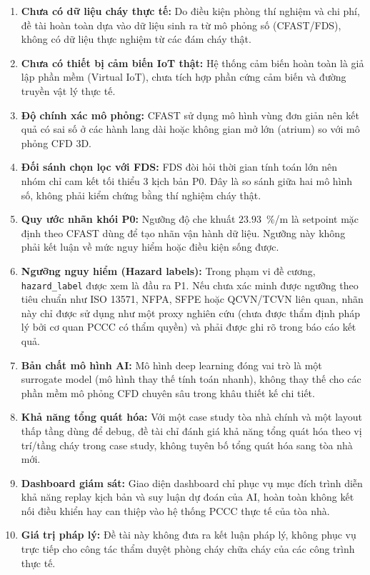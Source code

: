 \begin{enumerate}
  \item \textbf{Chưa có dữ liệu cháy thực tế:} Do điều kiện phòng thí nghiệm và chi phí, đề tài hoàn toàn dựa vào dữ liệu sinh ra từ mô phỏng số (CFAST/FDS), không có dữ liệu thực nghiệm từ các đám cháy thật.
  \item \textbf{Chưa có thiết bị cảm biến IoT thật:} Hệ thống cảm biến hoàn toàn là giả lập phần mềm (Virtual IoT), chưa tích hợp phần cứng cảm biến và đường truyền vật lý thực tế.
  \item \textbf{Độ chính xác mô phỏng:} CFAST sử dụng mô hình vùng đơn giản nên kết quả có sai số ở các hành lang dài hoặc không gian mở lớn (atrium) so với mô phỏng CFD 3D.
  \item \textbf{Đối sánh chọn lọc với FDS:} FDS đòi hỏi thời gian tính toán lớn nên nhóm chỉ cam kết tối thiểu 3 kịch bản P0. Đây là so sánh giữa hai mô hình số, không phải kiểm chứng bằng thí nghiệm cháy thật.
  \item \textbf{Quy ước nhãn khói P0:} Ngưỡng độ che khuất $23.93$~\%/m là setpoint mặc định theo CFAST dùng để tạo nhãn vận hành dữ liệu. Ngưỡng này không phải kết luận về mức nguy hiểm hoặc điều kiện sống được.
  \item \textbf{Ngưỡng nguy hiểm (Hazard labels):} Trong phạm vi đề cương, \texttt{hazard\_label} được xem là đầu ra P1. Nếu chưa xác minh được ngưỡng theo tiêu chuẩn như ISO 13571, NFPA, SFPE hoặc QCVN/TCVN liên quan, nhãn này chỉ được sử dụng như một proxy nghiên cứu (chưa được thẩm định pháp lý bởi cơ quan PCCC có thẩm quyền) và phải được ghi rõ trong báo cáo kết quả.
  \item \textbf{Bản chất mô hình AI:} Mô hình deep learning đóng vai trò là một surrogate model (mô hình thay thế tính toán nhanh), không thay thế cho các phần mềm mô phỏng CFD chuyên sâu trong khâu thiết kế chi tiết.
  \item \textbf{Khả năng tổng quát hóa:} Với một case study tòa nhà chính và một layout thấp tầng dùng để debug, đề tài chỉ đánh giá khả năng tổng quát hóa theo vị trí/tầng cháy trong case study, không tuyên bố tổng quát hóa sang tòa nhà mới.
  \item \textbf{Dashboard giám sát:} Giao diện dashboard chỉ phục vụ mục đích trình diễn khả năng replay kịch bản và suy luận dự đoán của AI, hoàn toàn không kết nối điều khiển hay can thiệp vào hệ thống PCCC thực tế của tòa nhà.
  \item \textbf{Giá trị pháp lý:} Đề tài này không đưa ra kết luận pháp lý, không phục vụ trực tiếp cho công tác thẩm duyệt phòng cháy chữa cháy của các công trình thực tế.
\end{enumerate}
